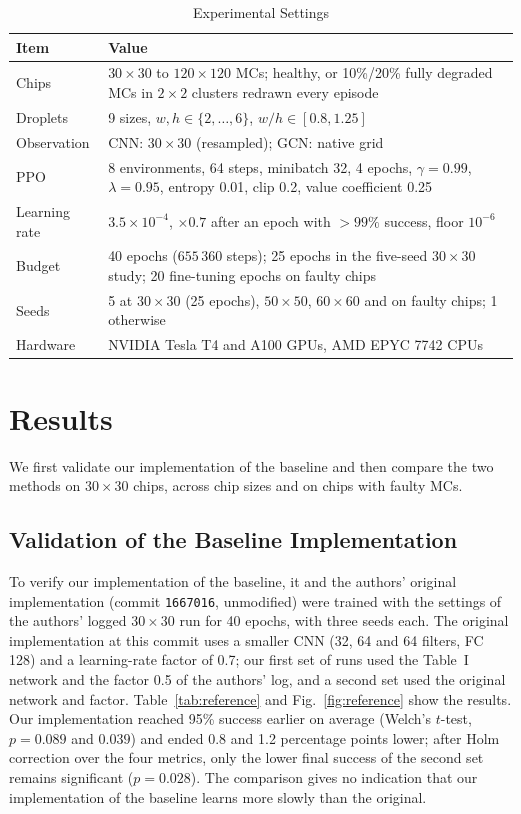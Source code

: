 \documentclass[conference,onecolumn,11pt]{IEEEtran}
\begin{document}
\begin{table}[!htbp]
\caption{Experimental Settings}
\label{tab:setup}
\centering\footnotesize
\begin{tabular}{@{}p{2.6cm}p{11cm}@{}}
\toprule
Item & Value \\ \midrule
Chips & $30\times30$ to $120\times120$ MCs; healthy, or 10\%/20\% fully degraded MCs in $2\times2$ clusters redrawn every episode \\
Droplets & 9 sizes, $w,h\in\{2,\dots,6\}$, $w/h\in[0.8,1.25]$ \\
Observation & CNN: $30\times30$ (resampled); GCN: native grid \\
PPO & 8 environments, 64 steps, minibatch 32, 4 epochs, $\gamma=0.99$, $\lambda=0.95$, entropy 0.01, clip 0.2, value coefficient 0.25 \\
Learning rate & $3.5\times10^{-4}$, $\times0.7$ after an epoch with $>99\%$ success, floor $10^{-6}$ \\
Budget & 40 epochs ($655\,360$ steps); 25 epochs in the five-seed $30\times30$ study; 20 fine-tuning epochs on faulty chips \\
Seeds & 5 at $30\times30$ (25 epochs), $50\times50$, $60\times60$ and on faulty chips; 1 otherwise \\
Hardware & NVIDIA Tesla T4 and A100 GPUs, AMD EPYC 7742 CPUs \\
\bottomrule
\end{tabular}
\end{table}

\section{Results}
We first validate our implementation of the baseline and then compare the two methods on $30\times30$ chips, across chip sizes and on chips with faulty MCs.

\subsection{Validation of the Baseline Implementation}\label{sec:valid}
To verify our implementation of the baseline, it and the authors' original implementation
\cite{elfarcode} (commit \texttt{1667016}, unmodified) were trained with the settings of the
authors' logged $30\times30$ run for 40 epochs, with three seeds each. The original
implementation at this commit uses a smaller CNN (32, 64 and 64 filters, FC 128) and a
learning-rate factor of 0.7; our first set of runs used the Table~I network and the factor
0.5 of the authors' log, and a second set used the original network and factor.
Table~\ref{tab:reference} and Fig.~\ref{fig:reference} show the results. Our implementation
reached 95\% success earlier on average (Welch's $t$-test, $p=0.089$ and $0.039$) and ended
0.8 and 1.2 percentage points lower; after Holm correction over the four metrics, only the
lower final success of the second set remains significant ($p=0.028$). The comparison gives
no indication that our implementation of the baseline learns more slowly than the original.
\end{document}
